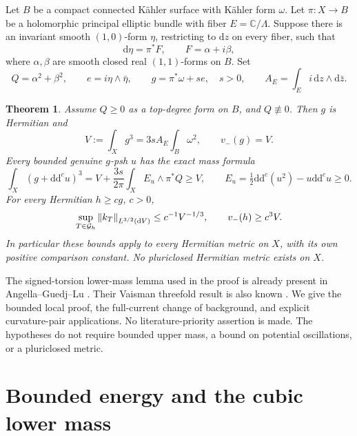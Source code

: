 \documentclass[11pt]{article}
\newtheorem{theorem}{Theorem}[section]
\newcommand{\ddc}{\mathrm d\mathrm d^c}
\newcommand{\vol}{\mathrm dV}
\newcommand{\norm}[1]{\left\|#1\right\|}
\begin{document}
Let \(B\) be a compact connected K\"ahler surface with K\"ahler form
\(\omega\). Let \(\pi:X\to B\) be a holomorphic principal elliptic bundle
with fiber \(E=\mathbb C/\Lambda\). Suppose there is an invariant smooth
\((1,0)\)-form \(\eta\), restricting to \(\mathrm dz\) on every fiber,
such that
\[
 \mathrm d\eta=\pi^*F,\qquad F=\alpha+i\beta,
\]
where \(\alpha,\beta\) are smooth closed real \((1,1)\)-forms on \(B\).
Set
\[
 Q=\alpha^2+\beta^2,\qquad
 e=i\eta\wedge\bar\eta,\qquad g=\pi^*\omega+s e,\quad s>0,
 \qquad A_E=\int_E i\,\mathrm dz\wedge\mathrm d\bar z.
\]

\begin{theorem}\label{thm:bundle}
Assume \(Q\ge0\) as a top-degree form on \(B\), and \(Q\not\equiv0\).
Then \(g\) is Hermitian and
\[
 V:=\int_Xg^3=3s A_E\int_B\omega^2,\qquad v_-(g)=V.
\]
Every bounded genuine \(g\)-psh \(u\) has the exact mass formula
\begin{equation}\label{eq:bundle-mass}
 \int_X(g+\ddc u)^3
 =V+\frac{3s}{2\pi}\int_X E_u\wedge\pi^*Q\ge V,
 \qquad E_u=\tfrac12\ddc(u^2)-u\ddc u\ge0.
\end{equation}
For every Hermitian \(h\ge c g\), \(c>0\),
\begin{equation}\label{eq:endpoint}
 \sup_{T\in{\cal G}_h}\norm{k_T}_{L^{3/2}(\vol)}
       \le c^{-1}V^{-1/3},\qquad v_-(h)\ge c^3 V.
\end{equation}
In particular these bounds apply to every Hermitian metric on \(X\),
with its own positive comparison constant. No pluriclosed Hermitian
metric exists on \(X\).
\end{theorem}

The signed-torsion lower-mass lemma used in the proof is already present
in Angella--Guedj--Lu \cite[Theorem 3.2]{AGL}. Their Vaisman threefold
result is also known \cite[Proposition 3.10]{AGL}. We give the bounded
local proof, the full-current change of background, and explicit
curvature-pair applications. No literature-priority assertion is made.
The hypotheses do not require bounded upper mass, a bound on potential
oscillations, or a pluriclosed metric.

\section{Bounded energy and the cubic lower mass}
\end{document}
